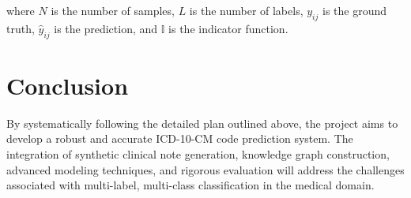 \documentclass[12pt, a4paper]{article}
\begin{document}
where \( N \) is the number of samples, \( L \) is the number of labels, \( y_{ij} \) is the ground truth, \( \hat{y}_{ij} \) is the prediction, and \( \mathbb{I} \) is the indicator function.

\section{Conclusion}

By systematically following the detailed plan outlined above, the project aims to develop a robust and accurate ICD-10-CM code prediction system. The integration of synthetic clinical note generation, knowledge graph construction, advanced modeling techniques, and rigorous evaluation will address the challenges associated with multi-label, multi-class classification in the medical domain.
\end{document}
